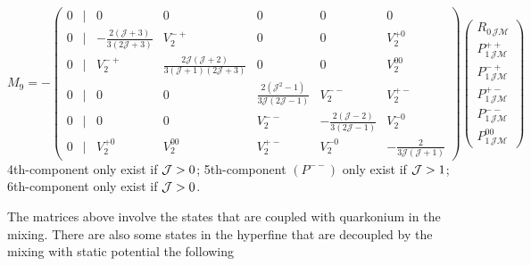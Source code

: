 \documentclass[11pt, a4paper]{article}
\begin{document}
\begin{equation}\label{eq:M9}
M_9=-
\begin{pmatrix}
0 &|& 0 & 0 & 0 & 0 & 0 \\
\hline
0 &|& -\frac{2(\mathcal{J}+3)}{3(2\mathcal{J}+3)} & V_2^{-+} & 0 & 0 & V_2^{+0} \\
0 &|& V_2^{-+} & \frac{2\mathcal{J}(\mathcal{J}+2)}{3(\mathcal{J}+1)(2\mathcal{J}+3)} & 0 & 0 & V_2^{00} \\
0 &|& 0 & 0 & \frac{2(\mathcal{J}^2-1)}{3\mathcal{J}(2\mathcal{J}-1)} & V_2^{--} & V_2^{+-} \\
0 &|& 0 & 0 & V_2^{--} & -\frac{2(\mathcal{J}-2)}{3(2\mathcal{J}-1)} & V_2^{-0} \\
0 &|& V_2^{+0} & V_2^{00} & V_2^{+-} & V_2^{-0} & -\frac{2}{3\mathcal{J}(\mathcal{J}+1)}
\end{pmatrix}
\begin{pmatrix}
 		R_{0\, \mathcal{J}\mathcal{M}} \\ P_{1\, \mathcal{J}\mathcal{M}}^{++} \\
 		P_{1\, \mathcal{J}\mathcal{M}}^{-+} \\ P_{1\, \mathcal{J}\mathcal{M}}^{+-} \\
P_{1\, \mathcal{J}\mathcal{M}}^{--}\\ P_{1\, \mathcal{J}\mathcal{M}}^{00}
 	\end{pmatrix}
\end{equation}
4th-component only exist if ${\cal J}>0$;
5th-component $(P^{--})$ only exist if ${\cal J}>1$;
6th-component only exist if ${\cal J}>0$. 

The matrices above involve the states that are coupled with quarkonium in the mixing. There are also some states in the hyperfine that are decoupled by the mixing with static potential the following
\end{document}
